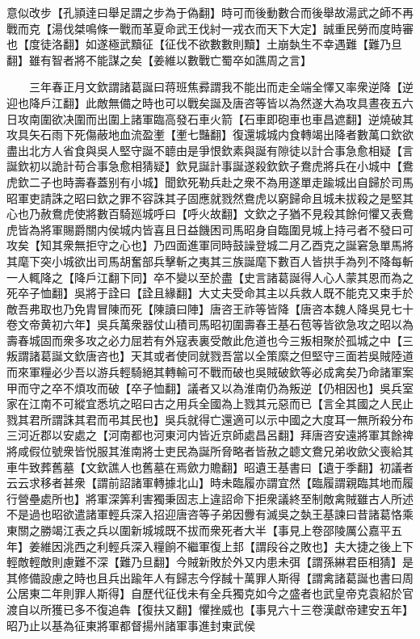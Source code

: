 意似改步【孔頴逹曰舉足謂之步為于偽翻】時可而後動數合而後舉故湯武之師不再戰而克【湯伐桀鳴條一戰而革夏命武王伐紂一戎衣而天下大定】誠重民勞而度時審也【度徒洛翻】如遂極武黷征【征伐不欲數數則黷】土崩埶生不幸遇難【難乃旦翻】雖有智者將不能謀之矣【姜維以數戰亡蜀卒如譙周之言】

　　三年春正月文欽謂諸葛誕曰蒋班焦彛謂我不能出而走全端全懌又率衆逆降【逆迎也降戶江翻】此敵無備之時也可以戰矣誕及唐咨等皆以為然遂大為攻具晝夜五六日攻南圍欲决圍而出圍上諸軍臨高發石車火箭【石車即砲車也車昌遮翻】逆燒破其攻具矢石雨下死傷蔽地血流盈壍【壍七豔翻】復還城城内食轉竭出降者數萬口欽欲盡出北方人省食與吳人堅守誕不聼由是爭恨欽素與誕有隙徒以計合事急愈相疑【言誕欽初以詭計苟合事急愈相猜疑】欽見誕計事誕遂殺欽欽子鴦虎將兵在小城中【鴦虎欽二子也時壽春蓋别有小城】聞欽死勒兵赴之衆不為用遂單走踰城出自歸於司馬昭軍吏請誅之昭曰欽之罪不容誅其子固應就戮然鴦虎以窮歸命且城未拔殺之是堅其心也乃赦鴦虎使將數百騎廵城呼曰【呼火故翻】文欽之子猶不見殺其餘何懼又表鴦虎皆為將軍賜爵關内侯城内皆喜且日益饑困司馬昭身自臨圍見城上持弓者不發曰可攻矣【知其衆無拒守之心也】乃四面進軍同時鼓譟登城二月乙酉克之誕窘急單馬將其麾下突小城欲出司馬胡奮部兵擊斬之夷其三族誕麾下數百人皆拱手為列不降每斬一人輒降之【降戶江翻下同】卒不變以至於盡【史言諸葛誕得人心人蒙其恩而為之死卒子恤翻】吳將于詮曰【詮且緣翻】大丈夫受命其主以兵救人既不能克又束手於敵吾弗取也乃免胄冒陳而死【陳讀曰陣】唐咨王祚等皆降【唐咨本魏人降吳見七十卷文帝黄初六年】吳兵萬衆器仗山積司馬昭初圍壽春王基石苞等皆欲急攻之昭以為壽春城固而衆多攻之必力屈若有外寇表裏受敵此危道也今三叛相聚於孤城之中【三叛謂諸葛誕文欽唐咨也】天其或者使同就戮吾當以全策縻之但堅守三面若吳賊陸道而來軍糧必少吾以游兵輕騎絕其轉輸可不戰而破也吳賊破欽等必成禽矣乃命諸軍案甲而守之卒不煩攻而破【卒子恤翻】議者又以為淮南仍為叛逆【仍相因也】吳兵室家在江南不可縱宜悉坑之昭曰古之用兵全國為上戮其元惡而已【言全其國之人民止戮其君所謂誅其君而弔其民也】吳兵就得亡還適可以示中國之大度耳一無所殺分布三河近郡以安處之【河南都也河東河内皆近京師處昌呂翻】拜唐咨安遠將軍其餘禆將咸假位號衆皆悦服其淮南將士吏民為誕所脅略者皆赦之聼文鴦兄弟收歛父喪給其車牛致葬舊墓【文欽譙人也舊墓在焉歛力贍翻】昭遺王基書曰【遺于季翻】初議者云云求移者甚衆【謂前詔諸軍轉據北山】時未臨履亦謂宜然【臨履謂親臨其地而履行營壘處所也】將軍深筭利害獨秉固志上違詔命下拒衆議終至制敵禽賊雖古人所述不是過也昭欲遣諸軍輕兵深入招迎唐咨等子弟因釁有滅吳之埶王基諫曰昔諸葛恪乘東關之勝竭江表之兵以圍新城城既不拔而衆死者大半【事見上卷邵陵厲公嘉平五年】姜維因洮西之利輕兵深入糧餉不繼軍復上邽【謂段谷之敗也】夫大捷之後上下輕敵輕敵則慮難不深【難乃旦翻】今賊新敗於外又内患未弭【謂孫綝君臣相猜】是其修備設慮之時也且兵出踰年人有歸志今俘馘十萬罪人斯得【謂禽諸葛誕也書曰周公居東二年則罪人斯得】自歷代征伐未有全兵獨克如今之盛者也武皇帝克袁紹於官渡自以所獲已多不復追犇【復扶又翻】懼挫威也【事見六十三卷漢獻帝建安五年】昭乃止以基為征東將軍都督揚州諸軍事進封東武侯

